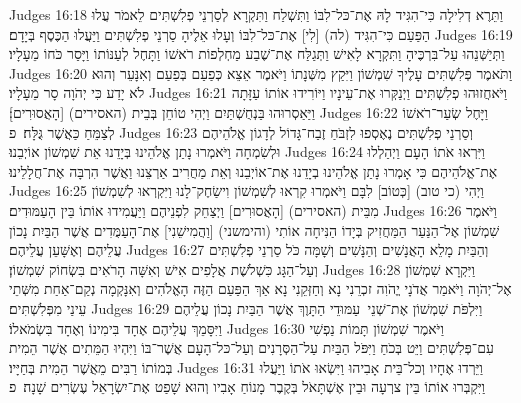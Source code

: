 Judges 16:18	וַתֵּרֶא דְלִילָה כִּי־הִגִּיד לָהּ אֶת־כּל־לִבּוֹ וַתִּשְׁלַח וַתִּקְרָא לְסַרְנֵי פְלִשְׁתִּים לֵאמֹר עֲלוּ הַפַּעַם כִּי־הִגִּיד (לה) [לִי] אֶת־כּל־לִבּוֹ וְעָלוּ אֵלֶיהָ סַרְנֵי פְלִשְׁתִּים וַיַּעֲלוּ הַכֶּסֶף בְּיָדָם׃
Judges 16:19	וַתְּיַשְּׁנֵהוּ עַל־בִּרְכֶּיהָ וַתִּקְרָא לָאִישׁ וַתְּגַלַּח אֶת־שֶׁבַע מַחְלְפוֹת רֹאשׁוֹ וַתָּחֶל לְעַנּוֹתוֹ וַיָּסַר כֹּחוֹ מֵעָלָיו׃
Judges 16:20	וַתֹּאמֶר פְּלִשְׁתִּים עָלֶיךָ שִׁמְשׁוֹן וַיִּקַץ מִשְּׁנָתוֹ וַיֹּאמֶר אֵצֵא כְּפַעַם בְּפַעַם וְאִנָּעֵר וְהוּא לֹא יָדַע כִּי יְהֹוָה סָר מֵעָלָיו׃
Judges 16:21	וַיֹּאחֲזוּהוּ פְלִשְׁתִּים וַיְנַקְּרוּ אֶת־עֵינָיו וַיּוֹרִידוּ אוֹתוֹ עַזָּתָה וַיַּאַסְרוּהוּ בַּנְחֻשְׁתַּיִם וַיְהִי טוֹחֵן בְּבֵית (האסירים) [הָאֲסוּרִים]׃
Judges 16:22	וַיָּחֶל שְׂעַר־רֹאשׁוֹ לְצַמֵּחַ כַּאֲשֶׁר גֻּלָּח׃ {פ}
Judges 16:23	וְסַרְנֵי פְלִשְׁתִּים נֶאֶסְפוּ לִזְבֹּחַ זֶבַח־גָּדוֹל לְדָגוֹן אֱלֹהֵיהֶם וּלְשִׂמְחָה וַיֹּאמְרוּ נָתַן אֱלֹהֵינוּ בְּיָדֵנוּ אֵת שִׁמְשׁוֹן אוֹיְבֵנוּ׃
Judges 16:24	וַיִּרְאוּ אֹתוֹ הָעָם וַיְהַלְלוּ אֶת־אֱלֹהֵיהֶם כִּי אָמְרוּ נָתַן אֱלֹהֵינוּ בְיָדֵנוּ אֶת־אוֹיְבֵנוּ וְאֵת מַחֲרִיב אַרְצֵנוּ וַאֲשֶׁר הִרְבָּה אֶת־חֲלָלֵינוּ׃
Judges 16:25	וַיְהִי (כי טוב) [כְּטוֹב] לִבָּם וַיֹּאמְרוּ קִרְאוּ לְשִׁמְשׁוֹן וִישַׂחֶק־לָנוּ וַיִּקְרְאוּ לְשִׁמְשׁוֹן מִבֵּית (האסירים) [הָאֲסוּרִים] וַיְצַחֵק לִפְנֵיהֶם וַיַּעֲמִידוּ אוֹתוֹ בֵּין הָעַמּוּדִים׃
Judges 16:26	וַיֹּאמֶר שִׁמְשׁוֹן אֶל־הַנַּעַר הַמַּחֲזִיק בְּיָדוֹ הַנִּיחָה אוֹתִי (והימשני) [וַהֲמִישֵׁנִי] אֶת־הָעַמֻּדִים אֲשֶׁר הַבַּיִת נָכוֹן עֲלֵיהֶם וְאֶשָּׁעֵן עֲלֵיהֶם׃
Judges 16:27	וְהַבַּיִת מָלֵא הָאֲנָשִׁים וְהַנָּשִׁים וְשָׁמָּה כֹּל סַרְנֵי פְלִשְׁתִּים וְעַל־הַגָּג כִּשְׁלֹשֶׁת אֲלָפִים אִישׁ וְאִשָּׁה הָרֹאִים בִּשְׂחוֹק שִׁמְשׁוֹן׃
Judges 16:28	וַיִּקְרָא שִׁמְשׁוֹן אֶל־יְהֹוָה וַיֹּאמַר אֲדֹנָי יֱהֹוִה זכְרֵנִי נָא וְחַזְּקֵנִי נָא אַךְ הַפַּעַם הַזֶּה הָאֱלֹהִים וְאִנָּקְמָה נְקַם־אַחַת מִשְּׁתֵי עֵינַי מִפְּלִשְׁתִּים׃
Judges 16:29	וַיִּלְפֹּת שִׁמְשׁוֹן אֶת־שְׁנֵי  עַמּוּדֵי הַתָּוֶךְ אֲשֶׁר הַבַּיִת נָכוֹן עֲלֵיהֶם וַיִּסָּמֵךְ עֲלֵיהֶם אֶחָד בִּימִינוֹ וְאֶחָד בִּשְׂמֹאלוֹ׃
Judges 16:30	וַיֹּאמֶר שִׁמְשׁוֹן תָּמוֹת נַפְשִׁי עִם־פְּלִשְׁתִּים וַיֵּט בְּכֹחַ וַיִּפֹּל הַבַּיִת עַל־הַסְּרָנִים וְעַל־כּל־הָעָם אֲשֶׁר־בּוֹ וַיִּהְיוּ הַמֵּתִים אֲשֶׁר הֵמִית בְּמוֹתוֹ רַבִּים מֵאֲשֶׁר הֵמִית בְּחַיָּיו׃
Judges 16:31	וַיֵּרְדוּ אֶחָיו וְכל־בֵּית אָבִיהוּ וַיִּשְׂאוּ אֹתוֹ וַיַּעֲלוּ  וַיִּקְבְּרוּ אוֹתוֹ בֵּין צרְעָה וּבֵין אֶשְׁתָּאֹל בְּקֶבֶר מָנוֹחַ אָבִיו וְהוּא שָׁפַט אֶת־יִשְׂרָאֵל עֶשְׂרִים שָׁנָה׃ {פ}
